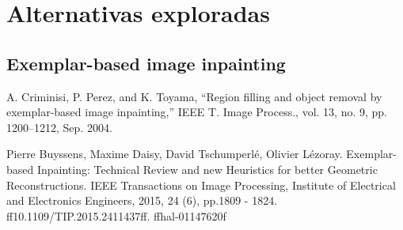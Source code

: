 \documentclass[conference]{IEEEtran}
\begin{document}
\section{Alternativas exploradas}

\subsection{Exemplar-based image inpainting}


\begin{thebibliography}{00}
 A. Criminisi, P. Perez, and K. Toyama, “Region filling and object
removal by exemplar-based image inpainting,” IEEE T. Image Process.,
vol. 13, no. 9, pp. 1200–1212, Sep. 2004.

 Pierre Buyssens, Maxime Daisy, David Tschumperlé, Olivier Lézoray. Exemplar-based Inpainting:
Technical Review and new Heuristics for better Geometric Reconstructions. IEEE Transactions on
Image Processing, Institute of Electrical and Electronics Engineers, 2015, 24 (6), pp.1809 - 1824.
ff10.1109/TIP.2015.2411437ff. ffhal-01147620f
\end{thebibliography}
\end{document}
